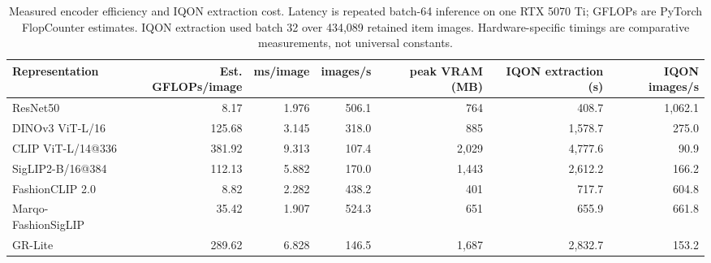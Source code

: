 \begin{table}[t]
\caption{Measured encoder efficiency and IQON extraction cost. Latency is repeated batch-64 inference on one RTX 5070 Ti; GFLOPs are PyTorch FlopCounter estimates. IQON extraction used batch 32 over 434,089 retained item images. Hardware-specific timings are comparative measurements, not universal constants.}
\label{tab:efficiency}
\centering
\scriptsize
\begin{tabular}{lrrrrrr}
\toprule
Representation & Est. GFLOPs/image & ms/image & images/s & peak VRAM (MB) & IQON extraction (s) & IQON images/s \\
\midrule
ResNet50 & 8.17 & 1.976 & 506.1 & 764 & 408.7 & 1,062.1 \\
DINOv3 ViT-L/16 & 125.68 & 3.145 & 318.0 & 885 & 1,578.7 & 275.0 \\
CLIP ViT-L/14@336 & 381.92 & 9.313 & 107.4 & 2,029 & 4,777.6 & 90.9 \\
SigLIP2-B/16@384 & 112.13 & 5.882 & 170.0 & 1,443 & 2,612.2 & 166.2 \\
FashionCLIP 2.0 & 8.82 & 2.282 & 438.2 & 401 & 717.7 & 604.8 \\
Marqo-FashionSigLIP & 35.42 & 1.907 & 524.3 & 651 & 655.9 & 661.8 \\
GR-Lite & 289.62 & 6.828 & 146.5 & 1,687 & 2,832.7 & 153.2 \\
\bottomrule
\end{tabular}
\end{table}

